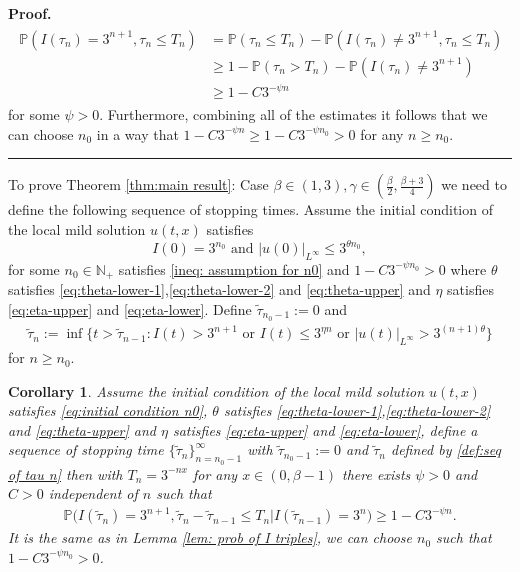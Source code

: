 \documentclass[12pt]{article}
\newtheorem{corollary}[theorem]{Corollary}
\newenvironment{proof}[1][Proof]{\noindent\textbf{#1.} }{\ \rule{0.5em}{0.5em}}
\numberwithin{equation}{section}
\begin{document}
\begin{proof}
\begin{align}
    \begin{split}
        \mathbb{P}(I(\tau_n)= 3^{n+1},\tau_n\leq T_n)&=\mathbb{P}(\tau_n\leq T_n)-\mathbb{P}( I(\tau_n)\ne 3^{n+1},\tau_n\leq T_n)\\
        &\geq 1-\mathbb{P}(\tau_n>T_n)-\mathbb{P}(I(\tau_n)\neq 3^{n+1})\\
        &\geq 1-C3^{-\psi n}
    \end{split}
\end{align}
for some $\psi>0$. Furthermore, combining all of the estimates it follows that we can choose $n_0$ in a way that $1-C3^{-\psi n}\geq 1-C3^{-\psi n_0}>0$ for any $n\geq n_0$.
\end{proof}

To prove Theorem \ref{thm:main result}: Case $\beta\in(1,3),\gamma\in (\frac{\beta}{2},\frac{\beta+3}{4})$ we need to define the following sequence of stopping times. Assume the initial condition of the local mild solution $u(t,x)$ satisfies
\begin{equation}
	I(0) = 3^{n_0} \text{ and } |u(0)|_{L^\infty} \leq 3^{\theta n_0},\label{eq:initial condition n0}
\end{equation}
for some $n_0\in \mathbb{N}_+$ satisfies \eqref{ineq: assumption for n0} and $1-C3^{-\psi n_0}>0$ where $\theta$ satisfies \eqref{eq:theta-lower-1},\eqref{eq:theta-lower-2} and \eqref{eq:theta-upper} and $\eta$ satisfies \eqref{eq:eta-upper} and \eqref{eq:eta-lower}. Define $\tilde{\tau}_{n_0-1}:=0$ and 
\begin{align}
    \tilde{\tau}_n:=
        \inf\{t>\tilde{\tau}_{n-1}: I(t)> 3^{n+1} \text{ or }I(t)\leq 3^{\eta n}\text{ or } |u(t)|_{L^\infty}> 3^{(n+1)\theta}\} \label{def:seq of tau n}
\end{align}
for $n\geq n_0$.
\begin{corollary}\label{cor: prob of I triples}
    Assume the initial condition of the local mild solution $u(t,x)$ satisfies \eqref{eq:initial condition n0}, $\theta$ satisfies \eqref{eq:theta-lower-1},\eqref{eq:theta-lower-2} and \eqref{eq:theta-upper} and $\eta$ satisfies \eqref{eq:eta-upper} and \eqref{eq:eta-lower}, define a sequence of stopping time $\{\tilde{\tau}_n\}_{n=n_0-1}^\infty$ with $\tilde{\tau}_{n_0-1}:=0$ and $\tilde{\tau}_n$ defined by \eqref{def:seq of tau n} then with $T_n=3^{-nx}$ for any $x\in (0,\beta-1)$ there exists $\psi>0$ and $C>0$ independent of $n$ such that
    \begin{align}
        \mathbb{P}\Big(I(\tilde{\tau}_n)=3^{n+1},\tilde{\tau}_n-\tilde{\tau}_{n-1}\leq T_n\Big| I(\tilde{\tau}_{n-1})=3^{n}\Big)\geq 1 -C 3^{-\psi n}.\label{ineq: conditional tripling}
    \end{align}
    It is the same as in Lemma \ref{lem: prob of I triples}, we can choose $n_0$ such that $1-C3^{-\psi n_0}>0$.
\end{corollary}
\end{document}
